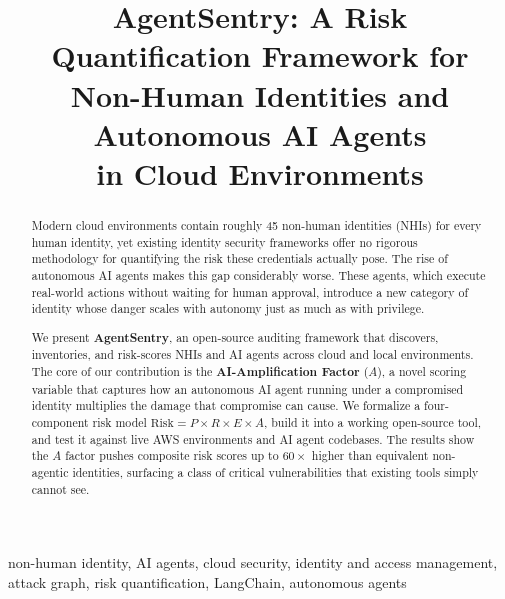 \documentclass[conference]{IEEEtran}
\begin{document}
\title{AgentSentry: A Risk Quantification Framework for\\
Non-Human Identities and Autonomous AI Agents\\
in Cloud Environments}

\author{
}

\maketitle

\begin{abstract}
Modern cloud environments contain roughly 45 non-human identities (NHIs) for
every human identity, yet existing identity security frameworks offer no
rigorous methodology for quantifying the risk these credentials actually pose.
The rise of autonomous AI agents makes this gap considerably worse. These
agents, which execute real-world actions without waiting for human approval,
introduce a new category of identity whose danger scales with autonomy just
as much as with privilege.

We present \textbf{AgentSentry}, an open-source auditing framework that
discovers, inventories, and risk-scores NHIs and AI agents across cloud and
local environments. The core of our contribution is the \textbf{AI-Amplification
Factor} ($A$), a novel scoring variable that captures how an autonomous AI agent
running under a compromised identity multiplies the damage that compromise can
cause. We formalize a four-component risk model $\text{Risk} = P \times R
\times E \times A$, build it into a working open-source tool, and test it
against live AWS environments and AI agent codebases. The results show the
$A$ factor pushes composite risk scores up to $60\times$ higher than equivalent
non-agentic identities, surfacing a class of critical vulnerabilities that
existing tools simply cannot see.
\end{abstract}

\begin{IEEEkeywords}
non-human identity, AI agents, cloud security, identity and access management,
attack graph, risk quantification, LangChain, autonomous agents
\end{IEEEkeywords}
\end{document}
